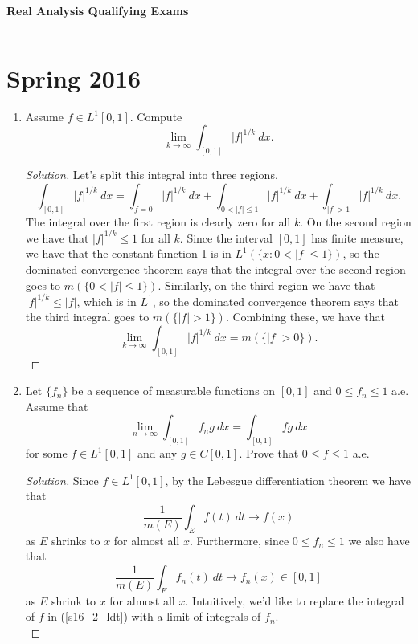 \documentclass[11pt,letterpaper]{report}
\newenvironment{solution}
{\begin{proof}[Solution]}
{\end{proof}}
\begin{document}
\begin{center}
{\bf \Large Real Analysis Qualifying Exams} %
\vspace{0.2cm}
\hrule
\end{center}

\section*{Spring 2016}
\begin{enumerate}
	\item Assume $f\in L^1[0,1]$. Compute
	\[
	\lim_{k\to \infty}\int_{[0,1]}|f|^{1/k}\ dx.
	\]
	\begin{solution}
		Let's split this integral into three regions.
		\[
		\int_{[0,1]}|f|^{1/k}\ dx = \int_{f=0}|f|^{1/k}\ dx + \int_{0<|f|\leq 1}|f|^{1/k}\ dx + \int_{|f|>1}|f|^{1/k}\ dx.
		\]
		The integral over the first region is clearly zero for all $k$. On the second region we have that $|f|^{1/k} \leq 1$ for all $k$. Since the interval $[0,1]$ has finite measure, we have that the constant function 1 is in $L^1(\{x: 0<|f|\leq 1\})$, so the dominated convergence theorem says that the integral over the second region goes to $m(\{0<|f|\leq 1\})$. Similarly, on the third region we have that $|f|^{1/k}\leq |f|$, which is in $L^1$, so the dominated convergence theorem says that the third integral goes to $m(\{|f|>1\})$. Combining these, we have that
		\[
		\lim_{k\to \infty}\int_{[0,1]}|f|^{1/k}\ dx = m(\{|f|>0\}).
		\]
	\end{solution}

	\item Let $\{f_n\}$ be a sequence of measurable functions on $[0,1]$ and $0\leq f_n\leq 1$ a.e. Assume that
	\[
	\lim_{n\to \infty}\int_{[0,1]}f_ng\ dx = \int_{[0,1]}fg\ dx
	\]
	for some $f\in L^1[0,1]$ and any $g\in C[0,1]$. Prove that $0\leq f\leq 1$ a.e.
	\begin{solution}
		Since $f\in L^1[0,1]$, by the Lebesgue differentiation theorem we have that
		\begin{equation}\label{s16_2_ldt}
		\frac{1}{m(E)}\int_Ef(t)\ dt \to f(x)
		\end{equation}
		as $E$ shrinks to $x$ for almost all $x$. Furthermore, since $0\leq f_n\leq 1$ we also have that
		\[
		\frac{1}{m(E)}\int_Ef_n(t)\ dt\to f_n(x)\in [0,1]
		\]
		as $E$ shrink to $x$ for almost all $x$.  Intuitively, we'd like to replace the integral of $f$ in (\ref{s16_2_ldt}) with a limit of integrals of $f_n$.\\


\end{solution}
\end{enumerate}
\end{document}
